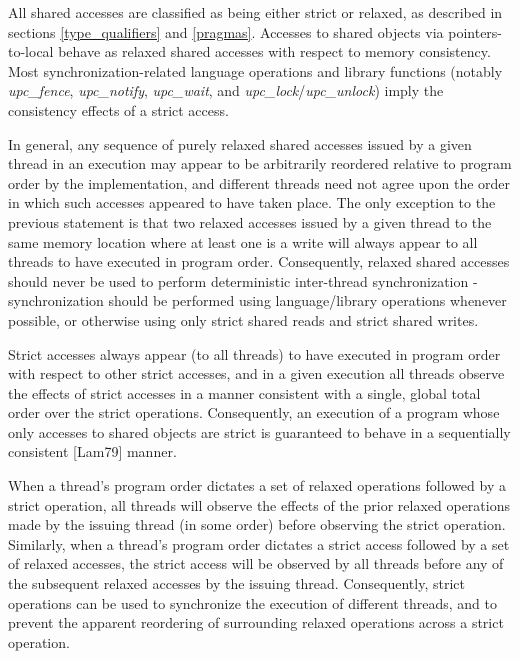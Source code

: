 \documentclass[12pt,titlepage]{article}
\newcounter{parnum}
\newcommand\np{\addtocounter{parnum}{1}\hspace{-2em}\makebox[2em][l]{\arabic{parnum}}}
\begin{document}
\np All shared accesses are classified as being either strict or relaxed,
  as described in sections \ref{type_qualifiers} and \ref{pragmas}.
  Accesses to shared objects via
  pointers-to-local behave as relaxed shared accesses with respect to memory
  consistency. Most synchronization-related language operations and library
  functions (notably {\it upc\_fence}, {\it upc\_notify}, {\it upc\_wait}, and
  {\it upc\_lock}/{\it upc\_unlock}) imply the consistency effects of a strict
  access.

\np In general, any sequence of purely relaxed shared accesses
  issued by a given
  thread in an execution may appear to be arbitrarily reordered relative to
  program order by the implementation, and different threads need not agree upon
  the order in which such accesses appeared to have taken place. The only
  exception to the previous statement is that two relaxed accesses issued by a
  given thread to the same memory location where at least one is a write will
  always appear to all threads to have executed in program order. Consequently,
  relaxed shared accesses should never be used to perform deterministic
  inter-thread synchronization - synchronization should be performed using
  language/library operations whenever possible, or otherwise using only strict
  shared reads and strict shared writes.

\np Strict accesses always appear (to all threads) to have executed
  in program
  order with respect to other strict accesses, and in a given execution all
  threads observe the effects of strict accesses in a manner consistent with a
  single, global total order over the strict operations. Consequently, an
  execution of a program whose only accesses to shared objects are strict 
  is guaranteed to behave in a sequentially consistent [Lam79] manner.

\np When a thread's program order dictates a set of relaxed
  operations followed by
  a strict operation, all threads will observe the effects of the prior relaxed
  operations made by the issuing thread (in some order) before observing the
  strict operation. Similarly, when a thread's program order dictates a strict
  access followed by a set of relaxed accesses, the strict access will be
  observed by all threads before any of the subsequent relaxed accesses by the
  issuing thread. Consequently, strict operations can be used to synchronize the
  execution of different threads, and to prevent the apparent reordering of
  surrounding relaxed operations across a strict operation.
\end{document}
